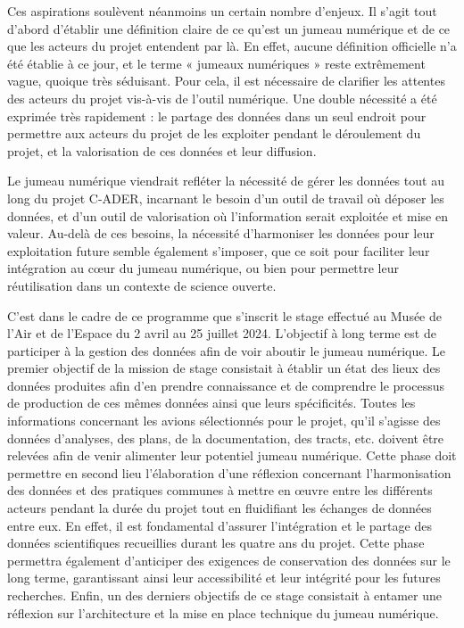 \documentclass[a4paper,12pt,twoside]{book}
\begin{document}
Ces aspirations soulèvent néanmoins un certain nombre d'enjeux. Il s'agit tout d'abord d'établir une définition claire de ce qu'est un jumeau numérique et de ce que les acteurs du projet entendent par là. En effet, aucune définition officielle n'a été établie à ce jour, et le terme « jumeaux numériques » reste extrêmement vague, quoique très séduisant. Pour cela, il est nécessaire de clarifier les attentes des acteurs du projet vis-à-vis de l'outil numérique. Une double nécessité a été exprimée très rapidement : le partage des données dans un seul endroit pour permettre aux acteurs du projet de les exploiter pendant le déroulement du projet, et la valorisation de ces données et leur diffusion.

 Le jumeau numérique viendrait refléter la nécessité de gérer les données tout au long du projet C-ADER, incarnant le besoin d'un outil de travail où déposer les données, et d’un outil de valorisation où l’information serait exploitée et mise en valeur. Au-delà de ces besoins, la nécessité d'harmoniser les données pour leur exploitation future semble également s'imposer, que ce soit pour faciliter leur intégration au cœur du jumeau numérique, ou bien pour permettre leur réutilisation dans un contexte de science ouverte.

C’est dans le cadre de ce programme que s'inscrit le stage effectué au Musée de l'Air et de l'Espace du 2 avril au 25 juillet 2024. L'objectif à long terme est de participer à la gestion des données afin de voir aboutir le jumeau numérique. Le premier objectif de la mission de stage consistait à établir un état des lieux des données produites afin d'en prendre connaissance et de comprendre le processus de production de ces mêmes données ainsi que leurs spécificités. Toutes les informations concernant les avions sélectionnés pour le projet, qu'il s'agisse des données d’analyses, des plans, de la documentation, des tracts, etc. doivent être relevées afin de venir alimenter leur potentiel jumeau numérique. Cette phase doit permettre en second lieu l'élaboration d'une réflexion concernant l'harmonisation des données et des pratiques communes à mettre en œuvre entre les différents acteurs pendant la durée du projet tout en fluidifiant les échanges de données entre eux. En effet, il est fondamental d’assurer l’intégration et le partage des données scientifiques recueillies durant les quatre ans du projet. Cette phase permettra également d’anticiper des exigences de conservation des données sur le long terme, garantissant ainsi leur accessibilité et leur intégrité pour les futures recherches. Enfin, un des derniers objectifs de ce stage consistait à entamer une réflexion sur l'architecture et la mise en place technique du jumeau numérique. 
\end{document}
